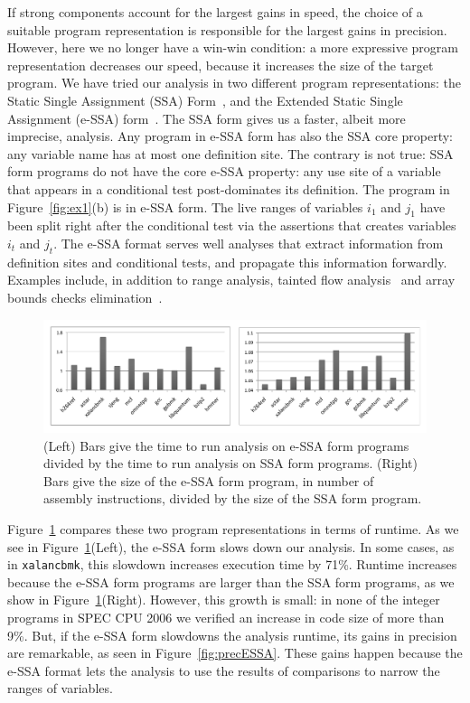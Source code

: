 \documentclass[times]{speauth}
\begin{document}
If strong components account for the largest gains in speed, the choice of
a suitable program representation is responsible for the largest gains in
precision.
However, here we no longer have a win-win condition: a more expressive
program representation decreases our speed, because it increases the
size of the target program.
We have tried our analysis in two different program representations: the
Static Single Assignment (SSA) Form~\cite{Cytron91}, and the Extended Static
Single Assignment (e-SSA) form~\cite{Bodik00}.
The SSA form gives us a faster, albeit more imprecise, analysis.
Any program in e-SSA form has also the SSA core property: any variable name
has at most one definition site.
The contrary is not true: SSA form programs do not have the core e-SSA
property: any use site of a variable that appears in a conditional test
post-dominates its definition.
The program in Figure~\ref{fig:ex1}(b) is in e-SSA form.
The live ranges of variables $i_1$ and $j_1$ have been split right after the
conditional test via the assertions that creates variables $i_t$ and $j_t$.
The e-SSA format serves well analyses that extract information from definition
sites and conditional tests, and propagate this information forwardly.
Examples include, in addition to range analysis, tainted flow
analysis~\cite{Rimsa11} and array bounds checks elimination~\cite{Bodik00}.

\begin{figure}[t!]
\begin{center}
\includegraphics[width=1\textwidth]{images/impactESSA}
\end{center}
\caption{\label{fig:impactESSA}
(Left) Bars give the time to run analysis on e-SSA form programs divided by
the time to run analysis on SSA form programs.
(Right) Bars give the size of the e-SSA form program, in number of
assembly instructions, divided by the size of the SSA form program.}
\end{figure}

Figure~\ref{fig:impactESSA} compares these two program representations in
terms of runtime.
As we see in Figure~\ref{fig:impactESSA}(Left), the e-SSA form slows down our
analysis.
In some cases, as in \texttt{xalancbmk}, this slowdown increases execution
time by 71\%.
Runtime increases because the e-SSA form programs are larger than the SSA
form programs, as we show in Figure~\ref{fig:impactESSA}(Right).
However, this growth is small: in none of the integer programs in SPEC
CPU 2006 we verified an increase in code size of more than 9\%.
But, if the e-SSA form slowdowns the analysis runtime, its gains in precision
are remarkable, as seen in Figure~\ref{fig:precESSA}.
These gains happen because the e-SSA format lets the analysis to use the
results of comparisons to narrow the ranges of variables.
\end{document}
